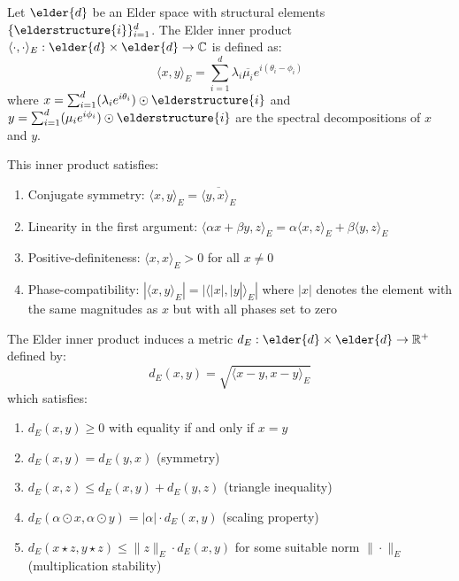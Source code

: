 \begin{definition}
Let $\elder{d}$ be an Elder space with structural elements $\{\elderstructure{i}\}_{i=1}^d$. The Elder inner product $\langle \cdot, \cdot \rangle_E: \elder{d} \times \elder{d} \rightarrow \mathbb{C}$ is defined as:
\begin{equation}
\langle x, y \rangle_E = \sum_{i=1}^d \lambda_i \overline{\mu_i} e^{i(\theta_i - \phi_i)}
\end{equation}
where $x = \sum_{i=1}^{d} (\lambda_i e^{i\theta_i}) \odot \elderstructure{i}$ and $y = \sum_{i=1}^{d} (\mu_i e^{i\phi_i}) \odot \elderstructure{i}$ are the spectral decompositions of $x$ and $y$.

This inner product satisfies:
\begin{enumerate}
    \item Conjugate symmetry: $\langle x, y \rangle_E = \overline{\langle y, x \rangle_E}$
    \item Linearity in the first argument: $\langle \alpha x + \beta y, z \rangle_E = \alpha \langle x, z \rangle_E + \beta \langle y, z \rangle_E$
    \item Positive-definiteness: $\langle x, x \rangle_E > 0$ for all $x \neq 0$
    \item Phase-compatibility: $|\langle x, y \rangle_E| = |\langle |x|, |y| \rangle_E|$ where $|x|$ denotes the element with the same magnitudes as $x$ but with all phases set to zero
\end{enumerate}
\end{definition}

\begin{theorem}
\label{thm:metric_properties}
The Elder inner product induces a metric $d_E: \elder{d} \times \elder{d} \rightarrow \mathbb{R}^+$ defined by:
\begin{equation}
d_E(x, y) = \sqrt{\langle x - y, x - y \rangle_E}
\end{equation}
which satisfies:
\begin{enumerate}
    \item $d_E(x, y) \geq 0$ with equality if and only if $x = y$
    \item $d_E(x, y) = d_E(y, x)$ (symmetry)
    \item $d_E(x, z) \leq d_E(x, y) + d_E(y, z)$ (triangle inequality)
    \item $d_E(\alpha \odot x, \alpha \odot y) = |\alpha| \cdot d_E(x, y)$ (scaling property)
    \item $d_E(x \star z, y \star z) \leq \|z\|_E \cdot d_E(x, y)$ for some suitable norm $\|\cdot\|_E$ (multiplication stability)
\end{enumerate}
\end{theorem}

